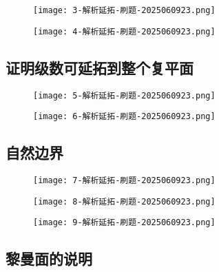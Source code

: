 \begin{figure}[H]
\centering
\texttt{[image: 3-解析延拓-刷题-2025060923.png]}
\label{}
\end{figure}
\begin{figure}[H]
\centering
\texttt{[image: 4-解析延拓-刷题-2025060923.png]}
\label{}
\end{figure}

\subsection{证明级数可延拓到整个复平面}

\begin{figure}[H]
\centering
\texttt{[image: 5-解析延拓-刷题-2025060923.png]}
\label{}
\end{figure}
\begin{figure}[H]
\centering
\texttt{[image: 6-解析延拓-刷题-2025060923.png]}
\label{}
\end{figure}

\subsection{自然边界}

\begin{figure}[H]
\centering
\texttt{[image: 7-解析延拓-刷题-2025060923.png]}
\label{}
\end{figure}

\begin{figure}[H]
\centering
\texttt{[image: 8-解析延拓-刷题-2025060923.png]}
\label{}
\end{figure}
\begin{figure}[H]
\centering
\texttt{[image: 9-解析延拓-刷题-2025060923.png]}
\label{}
\end{figure}

\subsection{黎曼面的说明}

